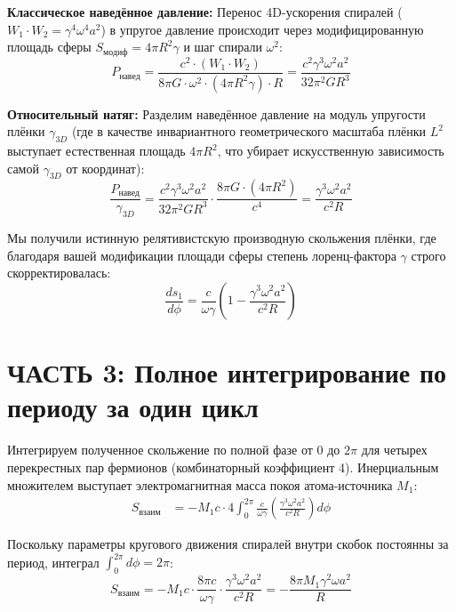 \documentclass[12pt,a4paper]{article}
\begin{document}
\textbf{Классическое наведённое давление:} Перенос 4D-ускорения спиралей ($W_1 \cdot W_2 = \gamma^4 \omega^4 a^2$) в упругое давление происходит через модифицированную площадь сферы $S_{модиф} = 4\pi R^2 \gamma$ и шаг спирали $\omega^2$:
\begin{equation}
P_{навед} = \frac{c^2 \cdot (W_1 \cdot W_2)}{8\pi G \cdot \omega^2 \cdot (4\pi R^2 \gamma) \cdot R} = \frac{c^2 \gamma^3 \omega^2 a^2}{32\pi^2 G R^3}
\end{equation}

\textbf{Относительный натяг:} Разделим наведённое давление на модуль упругости плёнки $\gamma_{3D}$ (где в качестве инвариантного геометрического масштаба плёнки $L^2$ выступает естественная площадь $4\pi R^2$, что убирает искусственную зависимость самой $\gamma_{3D}$ от координат):
\begin{equation}
\frac{P_{навед}}{\gamma_{3D}} = \frac{c^2 \gamma^3 \omega^2 a^2}{32\pi^2 G R^3} \cdot \frac{8\pi G \cdot (4\pi R^2)}{c^4} = \frac{\gamma^3 \omega^2 a^2}{c^2 R}
\end{equation}

Мы получили истинную релятивистскую производную скольжения плёнки, где благодаря вашей модификации площади сферы степень лоренц-фактора $\gamma$ строго скорректировалась:
\begin{equation}
\frac{ds_1}{d\phi} = \frac{c}{\omega \gamma} \left( 1 - \frac{\gamma^3 \omega^2 a^2}{c^2 R} \right)
\end{equation}

\section*{ЧАСТЬ 3: Полное интегрирование по периоду за один цикл}

Интегрируем полученное скольжение по полной фазе от $0$ до $2\pi$ для четырех перекрестных пар фермионов (комбинаторный коэффициент 4). Инерциальным множителем выступает электромагнитная масса покоя атома-источника $M_1$:
\begin{align}
S_{взаим} &= - M_1 c \cdot 4 \int_0^{2\pi} \frac{c}{\omega \gamma} \left( \frac{\gamma^3 \omega^2 a^2}{c^2 R} \right) d\phi
\end{align}

Поскольку параметры кругового движения спиралей внутри скобок постоянны за период, интеграл $\int_0^{2\pi} d\phi = 2\pi$:
\begin{equation}
S_{взаим} = - M_1 c \cdot \frac{8\pi c}{\omega \gamma} \cdot \frac{\gamma^3 \omega^2 a^2}{c^2 R} = - \frac{8\pi M_1 \gamma^2 \omega a^2}{R}
\end{equation}
\end{document}
